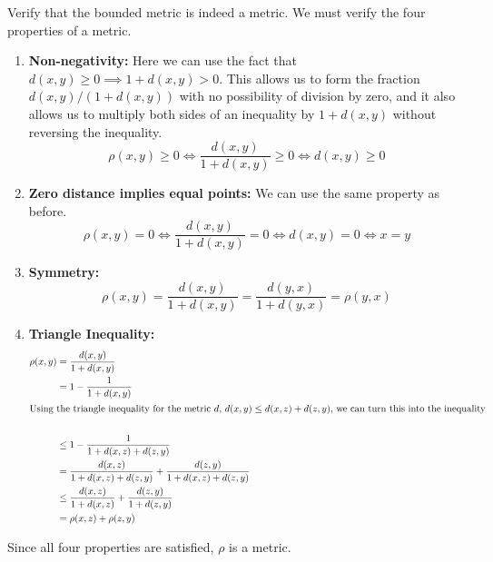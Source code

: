 \documentclass[10pt]{amsart}
\theoremstyle{plain}
\newenvironment{exercise}[1]{%
  \renewcommand\themanualtheoreminner{#1}%
  \manualtheoreminner
}{\endmanualtheoreminner}
\theoremstyle{definition}
\newcommand{\<}{\langle}
\renewcommand{\>}{\rangle}
\begin{document}
\begin{exercise}{1.10}
	Verify that the bounded metric is indeed a metric.
\end{exercise}
We must verify the four properties of a metric.
\begin{enumerate}
	\item \textbf{Non-negativity:} Here we can use the fact that $d(x,y) \geq 0 \implies 1+d(x,y) > 0$. This allows us to form the fraction $d(x,y) / (1 + d(x,y))$ with no possibility of division by zero, and it also allows us to multiply both sides of an inequality by $1 + d(x,y)$ without reversing the inequality.
	\[
		\rho(x,y) \geq 0 \iff \frac{d(x,y)}{1 + d(x,y)} \geq 0 \iff d(x,y) \geq 0
	\]

	\item \textbf{Zero distance implies equal points:} We can use the same property as before.
	\[
		\rho(x,y) = 0 \iff \frac{d(x,y)}{1 + d(x,y)} = 0 \iff d(x,y) = 0 \iff x=y
	\]

	\item \textbf{Symmetry:}
	\[
		\rho(x,y) = \frac{d(x,y)}{1+d(x,y)} = \frac{d(y,x)}{1+d(y,x)} = \rho(y,x)
	\] 

	\item \textbf{Triangle Inequality:}
	\begin{align*}
		\rho(x,y) &= \frac{d(x,y)}{1+d(x,y)} \\
			  &= 1 - \frac{1}{1+d(x,y)} \\
			  \intertext{Using the triangle inequality for the metric $d$, $d(x,y) \leq d(x,z) + d(z,y)$, we can turn this into the inequality} \\
			  &\leq 1 - \frac{1}{1 + d(x,z) + d(z,y)} \\
			  &= \frac{d(x,z)}{1+d(x,z)+d(z,y)} + \frac{d(z,y)}{1+d(x,z)+d(z,y)} \\
			  &\leq \frac{d(x,z)}{1+d(x,z)} + \frac{d(z,y)}{1+d(z,y)} \\
			  &= \rho(x,z) + \rho(z,y)
	\end{align*}
\end{enumerate}
Since all four properties are satisfied, $\rho$ is a metric.
\end{document}
